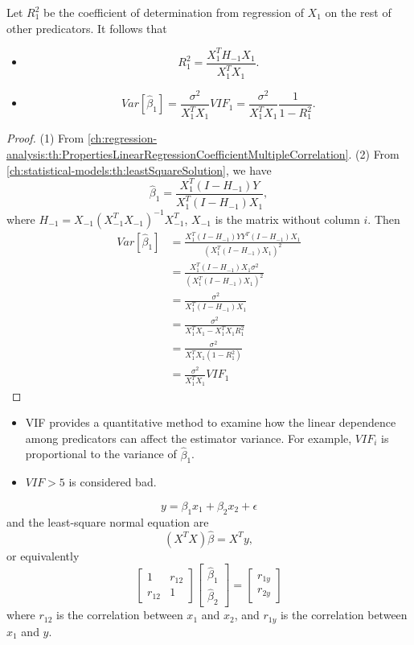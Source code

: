 \begin{refsection}
\begin{lemma}
Let $R^2_1$ be the coefficient of determination from regression of $X_1$ on the rest of other predicators.	
It follows that
\begin{itemize}
	\item $$R_1^2 = \frac{X_1^TH_{-1}X_1}{X_1^TX_1}.$$
	\item $$Var[\hat{\beta}_1] = \frac{\sigma^2}{X_1^TX_1}VIF_1 = \frac{\sigma^2}{X_1^TX_1}\frac{1}{1-R_1^2}.$$
\end{itemize}
\end{lemma}
\begin{proof}
(1) From \autoref{ch:regression-analysis:th:PropertiesLinearRegressionCoefficientMultipleCorrelation}.
(2) From \autoref{ch:statistical-models:th:leastSquareSolution}, we have $$\hat{\beta}_1 = \frac{X_1^T(I - H_{-1})Y}{X_1^T(I-H_{-1})X_1},$$
where $H_{-1} = X_{-1}(X_{-1}^TX_{-1})^{-1} X_{-1}^T$, $X_{-1}$ is the matrix without column $i$.
Then
\begin{align*}
Var[\hat{\beta}_1] &= \frac{X_1^T(I - H_{-1})YY^T(I - H_{-1})X_1}{(X_1^T(I-H_{-1})X_1)^2} \\
&= \frac{X_1^T(I - H_{-1})X_1 \sigma^2}{(X_1^T(I-H_{-1})X_1)^2} \\
&=\frac{\sigma^2}{X_1^T(I-H_{-1})X_1} \\
&=\frac{\sigma^2}{X_1^TX_1 - X_1^TX_1R_1^2} \\
&=\frac{\sigma^2}{X_1^TX_1(1 - R_1^2)} \\
&=\frac{\sigma^2}{X_1^TX_1}VIF_1
\end{align*}
\end{proof}


\begin{method}\hfill
	\begin{itemize}
		\item VIF provides a quantitative method to examine how the linear dependence among predicators can affect the estimator variance.  For example, $VIF_i$ is proportional to the variance of $\hat{\beta}_1$.
		\item $VIF > 5 $ is considered bad.
	\end{itemize}
\end{method}



\begin{example}\cite[326]{montgomery2012introduction}
$$y = \beta_1 x_1 + \beta_2 x_2 + \epsilon$$
and the least-square normal equation are
$$(X^TX)\hat{\beta} = X^Ty,$$
or equivalently
$$\begin{bmatrix}
1 & r_{12} \\
r_{12} & 1
\end{bmatrix}\begin{bmatrix}
\hat{\beta}_1\\
\hat{\beta}_2
\end{bmatrix} = \begin{bmatrix}
r_{1y}\\
r_{2y}
\end{bmatrix}$$
where $r_{12}$ is the correlation between $x_1$ and $x_2$, and $r_{1y}$ is the correlation between $x_1$ and $y$. 


\end{example}
\end{refsection}
